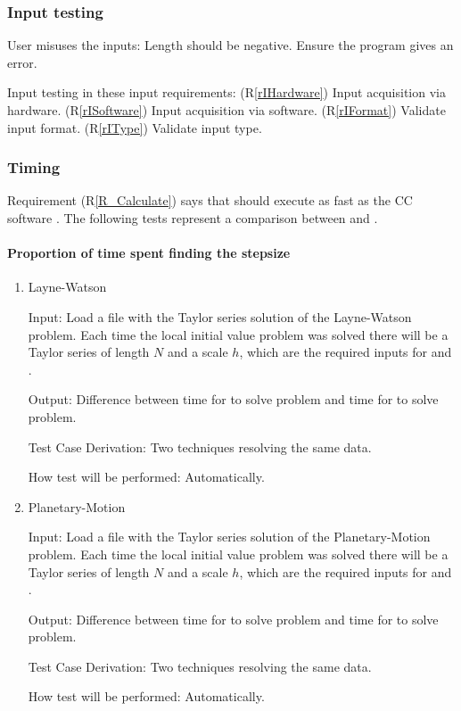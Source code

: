 \documentclass[12pt, titlepage]{article}
\newcommand{\rref}[1]{(R\ref{#1})}
\begin{document}
\subsubsection{Input testing}

User misuses the inputs: Length should be negative. Ensure the program gives an error.

Input testing in these input requirements:
\rref{rIHardware} Input acquisition via hardware.
\rref{rISoftware} Input acquisition via software.
\rref{rIFormat} Validate input format.
\rref{rIType} Validate input type.

\subsubsection{Timing}

Requirement \rref{R_Calculate} says that  should execute as fast as
the CC software \rdcon. The following tests represent a comparison between
 and \rdcon.

\paragraph{Proportion of time spent finding the stepsize}

\begin{enumerate}

\item{Layne-Watson\\}

					
					
Input: Load a file with the Taylor series solution of the Layne-Watson problem. Each time the
    local initial value problem was solved there will be a Taylor series of length $N$ and a scale $h$,
    which are the required inputs for  and \rdcon.
					
Output: Difference between time for  to solve problem and time for \rdcon to solve problem.

Test Case Derivation: Two techniques resolving the same data.
					
How test will be performed: Automatically.
					
\item{Planetary-Motion\\}

					
					
Input: Load a file with the Taylor series solution of the Planetary-Motion problem. Each time the
    local initial value problem was solved there will be a Taylor series of length $N$ and a scale $h$,
    which are the required inputs for  and \rdcon.
					
Output: Difference between time for  to solve problem and time for \rdcon to solve problem.

Test Case Derivation: Two techniques resolving the same data.
					
How test will be performed: Automatically.

\end{enumerate}
\end{document}
